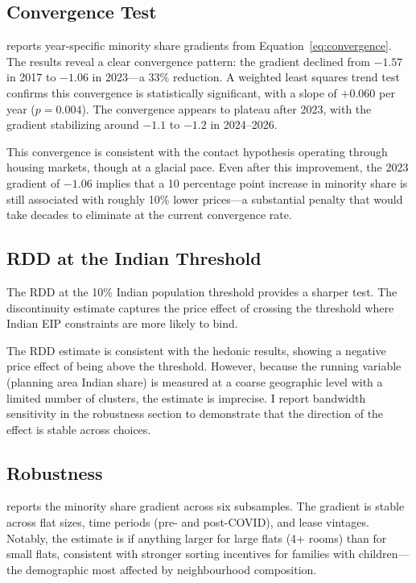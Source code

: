 \documentclass[12pt]{article}
\begin{document}


\subsection{Convergence Test}

 reports year-specific minority share gradients from Equation~\ref{eq:convergence}. The results reveal a clear convergence pattern: the gradient declined from $-1.57$ in 2017 to $-1.06$ in 2023---a 33\% reduction. A weighted least squares trend test confirms this convergence is statistically significant, with a slope of $+0.060$ per year ($p = 0.004$). The convergence appears to plateau after 2023, with the gradient stabilizing around $-1.1$ to $-1.2$ in 2024--2026.

This convergence is consistent with the contact hypothesis operating through housing markets, though at a glacial pace. Even after this improvement, the 2023 gradient of $-1.06$ implies that a 10 percentage point increase in minority share is still associated with roughly 10\% lower prices---a substantial penalty that would take decades to eliminate at the current convergence rate.



\subsection{RDD at the Indian Threshold}

The RDD at the 10\% Indian population threshold provides a sharper test. The discontinuity estimate captures the price effect of crossing the threshold where Indian EIP constraints are more likely to bind.

The RDD estimate is consistent with the hedonic results, showing a negative price effect of being above the threshold. However, because the running variable (planning area Indian share) is measured at a coarse geographic level with a limited number of clusters, the estimate is imprecise. I report bandwidth sensitivity in the robustness section to demonstrate that the direction of the effect is stable across choices.

\subsection{Robustness}

 reports the minority share gradient across six subsamples. The gradient is stable across flat sizes, time periods (pre- and post-COVID), and lease vintages. Notably, the estimate is if anything larger for large flats (4+ rooms) than for small flats, consistent with stronger sorting incentives for families with children---the demographic most affected by neighbourhood composition.
\end{document}
